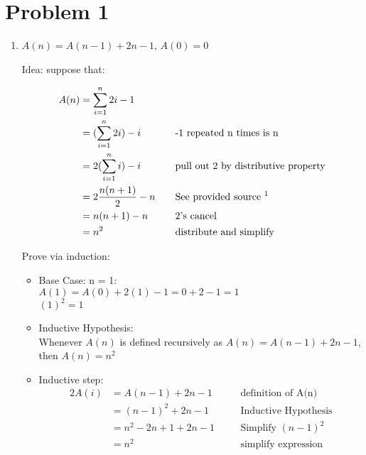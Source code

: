 \documentclass[11pt, letterpaper]{article}
\begin{document}
\section*{Problem 1}

\begin{enumerate}[label=(\alph*)]
\item $A(n) = A(n - 1) + 2n - 1$, $A(0) = 0$

Idea: suppose that:

\begin{alignat*}{2}
A(n) &= \sum_{i = 1}^{n} 2i - 1 &\quad & \\
&= (\sum_{i = 1}^n 2i) - i &\quad &  \text{-1 repeated n times is n} \\
&= 2(\sum_{i = 1}^n i) - i &\quad & \text{pull out 2 by distributive property} \\
&= 2 \frac{n (n + 1)}{2} - n &\quad &\text{See provided source \footnotemark} \\
&= n(n + 1) - n &\quad &\text{2's cancel} \\
&= n^2 &\quad &\text{distribute and simplify} \\
\end{alignat*}


\begin{center}
Prove via induction:
\end{center}

\begin{itemize}


\item Base Case: n = 1: \\
$A(1) = A(0) + 2(1) - 1 = 0 + 2 - 1 = 1$\\
$(1)^2 = 1$

\item Inductive Hypothesis: \\
Whenever $A(n)$ is defined recursively as $A(n) = A(n - 1) + 2n - 1$, then $A(n) = n^2$

\item Inductive step: \\
\begin{alignat*}{2}
A(i) &= A(n - 1) + 2n - 1 &\quad &\text{definition of A(n)} \\
&= (n - 1)^2 + 2n - 1 &\quad &\text{Inductive Hypothesis} \\
&= n^2 - 2n + 1 + 2n - 1 &\quad &\text{Simplify $(n -1)^2$} \\
&= n^2 &\quad &\text{simplify expression} \\
\end{alignat*}
\end{itemize}


\end{enumerate}
\end{document}
